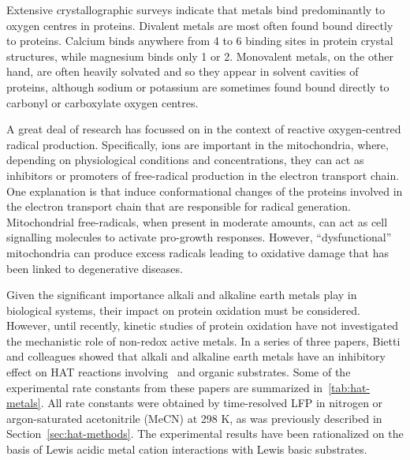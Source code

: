 \begin{doublespace}
Extensive crystallographic surveys indicate that metals bind predominantly to
oxygen centres in proteins.\cite{Harding1999, Harding2004, Hsin2008} Divalent
metals are most often found bound directly to proteins. Calcium binds anywhere
from 4 to 6 binding sites in protein crystal structures, while magnesium binds
only 1 or 2. Monovalent metals, on the other hand, are often heavily solvated
and so they appear in solvent cavities of proteins, although sodium or potassium
are sometimes found bound directly to carbonyl or carboxylate oxygen
centres.\cite{Harding2010}

A great deal of research has focussed on  in the context of reactive
oxygen-centred radical production.\cite{Goerlach2015} Specifically, 
ions are important in the mitochondria, where, depending on physiological
conditions and concentrations, they can act as inhibitors or promoters of
free-radical production in the electron transport chain.\cite{AdamVizi2010} One
explanation is that  induce conformational changes of the proteins
involved in the electron transport chain that are responsible for radical
generation.\cite{Brookes2004} Mitochondrial free-radicals, when present in
moderate amounts, can act as cell signalling molecules to activate pro-growth
responses.\cite{Sullivan2014} However, ``dysfunctional'' mitochondria can
produce excess radicals leading to oxidative damage that has been linked to
degenerative diseases.

Given the significant importance alkali and alkaline earth metals play in
biological systems, their impact on protein oxidation must be considered.
However, until recently, kinetic studies of protein oxidation have not
investigated the mechanistic role of non-redox active metals. In a series of
three papers,\cite{Salamone2013a, Salamone2015metals, Salamone2016} Bietti and
colleagues showed that alkali and alkaline earth metals have an inhibitory
effect on HAT reactions involving \cumo\ and organic substrates. Some of the
experimental rate constants from these papers are summarized
in~\ref{tab:hat-metals}. All rate constants were obtained by time-resolved LFP
in nitrogen or argon-saturated acetonitrile (MeCN) at 298 K, as was previously
described in Section~\ref{sec:hat-methods}. The experimental results have been
rationalized on the basis of Lewis acidic metal cation interactions with Lewis
basic substrates.



\end{doublespace}
